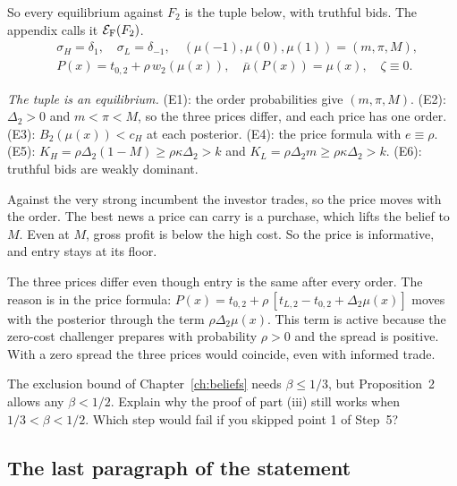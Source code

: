 So every equilibrium against \(F_2\) is the tuple below, with truthful bids. The appendix calls it
\(\mathcal E_{\rm F}(F_2)\).
\[
\begin{aligned}
&\sigma_H=\delta_1,\quad \sigma_L=\delta_{-1},\quad (\mu(-1),\mu(0),\mu(1))=(m,\pi,M),\\
&P(x)=t_{0,2}+\rho\,w_2(\mu(x)),\quad \bar\mu(P(x))=\mu(x),\quad \zeta\equiv0.
\end{aligned}
\]

\emph{The tuple is an equilibrium.} (E1): the order probabilities give \((m,\pi,M)\). (E2): \(\Delta_2>0\) and
\(m<\pi<M\), so the three prices differ, and each price has one order. (E3): \(B_2(\mu(x))<c_H\) at each posterior.
(E4): the price formula with \(e\equiv\rho\). (E5): \(K_H=\rho\Delta_2(1-M)\ge\rho\kappa\Delta_2>k\) and
\(K_L=\rho\Delta_2m\ge\rho\kappa\Delta_2>k\). (E6): truthful bids are weakly dominant.

\begin{intuition}
Against the very strong incumbent the investor trades, so the price moves with the order. The best news a price
can carry is a purchase, which lifts the belief to \(M\). Even at \(M\), gross profit is below the high cost. So the
price is informative, and entry stays at its floor.
\end{intuition}

The three prices differ even though entry is the same after every order. The reason is in the price formula:
\(P(x)=t_{0,2}+\rho\,[t_{L,2}-t_{0,2}+\Delta_2\mu(x)]\) moves with the posterior through the term
\(\rho\Delta_2\mu(x)\). This term is active because the zero-cost challenger prepares with probability \(\rho>0\) and
the spread is positive. With a zero spread the three prices would coincide, even with informed trade.

\begin{checkyourself}
The exclusion bound of Chapter~\ref{ch:beliefs} needs \(\beta\le1/3\), but Proposition~2 allows any \(\beta<1/2\).
Explain why the proof of part (iii) still works when \(1/3<\beta<1/2\). Which step would fail if you skipped point 1
of Step~5?
\label{q:ccc-beta}
\end{checkyourself}

\subsection{The last paragraph of the statement}


